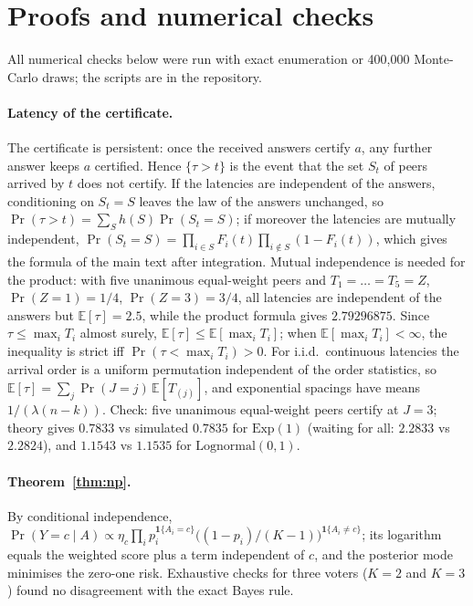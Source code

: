 \documentclass[11pt]{article}
\theoremstyle{definition}
\theoremstyle{remark}
\begin{document}



\appendix
\section{Proofs and numerical checks}
All numerical checks below were run with exact enumeration or 400{,}000 Monte-Carlo draws; the scripts are
in the repository.

\paragraph{Latency of the certificate.}
The certificate is persistent: once the received answers certify $a$, any further answer keeps $a$
certified. Hence $\{\tau>t\}$ is the event that the set $S_t$ of peers arrived by $t$ does not
certify. If the latencies are independent of the answers, conditioning on $S_t=S$ leaves the law of the
answers unchanged, so $\Pr(\tau>t)=\sum_S h(S)\Pr(S_t=S)$; if moreover the latencies are mutually
independent, $\Pr(S_t=S)=\prod_{i\in S}F_i(t)\prod_{i\notin S}(1-F_i(t))$, which gives the formula of the
main text after integration. Mutual independence is needed for the product: with five unanimous
equal-weight peers and $T_1=\dots=T_5=Z$, $\Pr(Z=1)=1/4$, $\Pr(Z=3)=3/4$, all latencies are independent of
the answers but $\mathbb E[\tau]=2.5$, while the product formula gives $2.79296875$. Since
$\tau\le\max_iT_i$ almost surely, $\mathbb E[\tau]\le\mathbb E[\max_i T_i]$; when $\mathbb E[\max_iT_i]<\infty$,
the inequality is strict iff $\Pr(\tau<\max_iT_i)>0$. For i.i.d.\ continuous latencies the arrival order is a uniform
permutation independent of the order statistics, so $\mathbb E[\tau]=\sum_j\Pr(J=j)\,\mathbb E[T_{(j)}]$,
and exponential spacings have means $1/(\lambda(n-k))$. Check: five unanimous equal-weight peers certify at
$J=3$; theory gives $0.7833$ vs simulated $0.7835$ for $\mathrm{Exp}(1)$ (waiting for all: $2.2833$ vs
$2.2824$), and $1.1543$ vs $1.1535$ for $\mathrm{Lognormal}(0,1)$.

\paragraph{Theorem~\ref{thm:np}.}
By conditional independence, $\Pr(Y=c\mid A)\propto\eta_c\prod_ip_i^{\mathbf 1\{A_i=c\}}
\bigl((1-p_i)/(K-1)\bigr)^{\mathbf 1\{A_i\ne c\}}$; its logarithm equals the weighted score plus a term
independent of $c$, and the posterior mode minimises the zero-one risk. Exhaustive checks for three voters
($K=2$ and $K=3$) found no disagreement with the exact Bayes rule.
\end{document}
